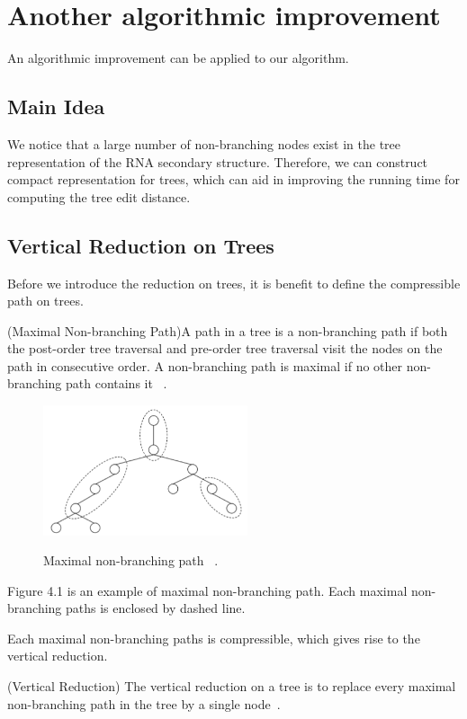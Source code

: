 \doublespacing
\chapter{Another algorithmic improvement}
An algorithmic improvement can be applied to our algorithm. 
\section{Main Idea}
We notice that a large number of non-branching nodes exist in the tree representation of the RNA secondary structure. Therefore, we can construct compact representation for trees, which can aid in improving the running time for computing the tree edit distance. 
\section{Vertical Reduction on Trees}
Before we introduce the reduction on trees, it is benefit to define the compressible path on trees.
\begin{definition}
(Maximal Non-branching Path)A path in a tree is a non-branching path
if both the post-order tree traversal and pre-order tree traversal visit the nodes on the path in consecutive order. A non-branching path is maximal if no other non-branching path contains it ~\cite{Chen2014}.
\end{definition}

\begin{figure}
		\centering
		\includegraphics[width=6cm,clip]{Figures/VComponent}
		\label{Maximal Non-branching Path.} 
		\caption{Maximal non-branching path ~\cite{Chen2014}.}
\end{figure}
Figure 4.1 is an example of maximal non-branching path. Each maximal non-branching paths is enclosed by dashed line.

Each maximal non-branching paths is compressible, which gives rise to the vertical reduction.
\begin{definition}
(Vertical Reduction)
The vertical reduction on a tree is to replace every maximal non-branching path in the tree by a single node~\cite{Chen2014}.
\end{definition}

